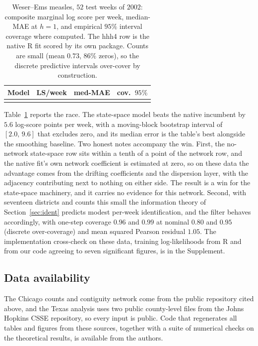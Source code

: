 \documentclass[12pt]{article}
\theoremstyle{plain}
\theoremstyle{definition}
\theoremstyle{remark}
\begin{document}
\begin{table}[t]
\centering\small
\caption{Weser--Ems measles, $52$ test weeks of $2002$: composite marginal log score per week, median-MAE at $h=1$, and empirical $95\%$ interval coverage where computed. The hhh4 row is the native R fit scored by its own package. Counts are small (mean $0.73$, $86\%$ zeros), so the discrete predictive intervals over-cover by construction.}\label{tab:measles}
\begin{tabular}{lccc}
\toprule
Model & LS/week & med-MAE & cov.\ $95\%$ \\
\midrule
{}{tables/tab_measles}
\bottomrule
\end{tabular}
\end{table}

Table~\ref{tab:measles} reports the race. The state-space model beats the native incumbent by $5.6$ log-score points per week, with a moving-block bootstrap interval of $[2.0,\,9.6]$ that excludes zero, and its median error is the table's best alongside the smoothing baseline. Two honest notes accompany the win. First, the no-network state-space row sits within a tenth of a point of the network row, and the native fit's own network coefficient is estimated at zero, so on these data the advantage comes from the drifting coefficients and the dispersion layer, with the adjacency contributing next to nothing on either side. The result is a win for the state-space machinery, and it carries no evidence for this network. Second, with seventeen districts and counts this small the information theory of Section~\ref{sec:ident} predicts modest per-week identification, and the filter behaves accordingly, with one-step coverage $0.96$ and $0.99$ at nominal $0.80$ and $0.95$ (discrete over-coverage) and mean squared Pearson residual $1.05$. The implementation cross-check on these data, training log-likelihoods from R and from our code agreeing to seven significant figures, is in the Supplement.

\subsection{Data availability}\label{sec:repro}
The Chicago counts and contiguity network come from the public repository cited above, and the Texas analysis uses two public county-level files from the Johns Hopkins CSSE repository, so every input is public. Code that regenerates all tables and figures from these sources, together with a suite of numerical checks on the theoretical results, is available from the authors.
\end{document}

